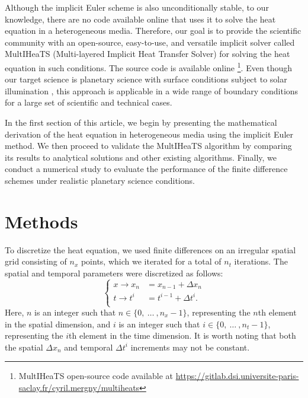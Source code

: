 \documentclass[sn-vancouver, Numbered]{sn-jnl}
\begin{document}
 
 Although the implicit Euler scheme is also unconditionally stable, to our knowledge, there are no code available online that uses it to solve the heat equation in a heterogeneous media. 
 Therefore, our goal is to provide the scientific community with an open-source, easy-to-use, and versatile implicit solver called MultIHeaTS (Multi-layered Implicit Heat Transfer Solver) for solving the heat equation in such conditions. The source code is available online \footnote{MultIHeaTS open-source code available at \url{https://gitlab.dsi.universite-paris-saclay.fr/cyril.mergny/multiheats}}. Even though our target science is planetary science with surface conditions subject to solar illumination \cite{Wesselink1948, Spencer1989, Schorghofer2010, Rozitis2011, Kieffer2013}, this approach is applicable in a wide range of boundary conditions for a large set of scientific and technical cases.

In the first section of this article, we begin by presenting the mathematical derivation of the heat equation in heterogeneous media using the implicit Euler method. We then proceed to validate the MultIHeaTS algorithm by comparing its results to analytical solutions and other existing algorithms. Finally, we conduct a numerical study to evaluate the performance of the finite difference schemes under realistic planetary science conditions.

\section{Methods}


To discretize the heat equation, we used finite differences on an irregular spatial grid consisting of $n_x$ points, which we iterated for a total of $n_t$ iterations. The spatial and temporal parameters were discretized as follows:
\begin{equation}
\begin{cases}
    x \rightarrow x_n &= x_{n-1} + \Delta x_n \\
    t \rightarrow t^i &= t^{i-1} + \Delta t^i .\\
    
\end{cases}
\end{equation}
Here, $n$ is an integer such that $n \in \{0, \: \dotsc \: , n_x-1 \} $, representing the $n$th element in the spatial dimension, and $i$ is an integer such that $i \in \{0, \: \dotsc \: , n_t-1 \} $, representing the $i$th element in the time dimension. It is worth noting that both the spatial $\Delta x_n$ and temporal $\Delta t^i$ increments may not be constant.
\end{document}
